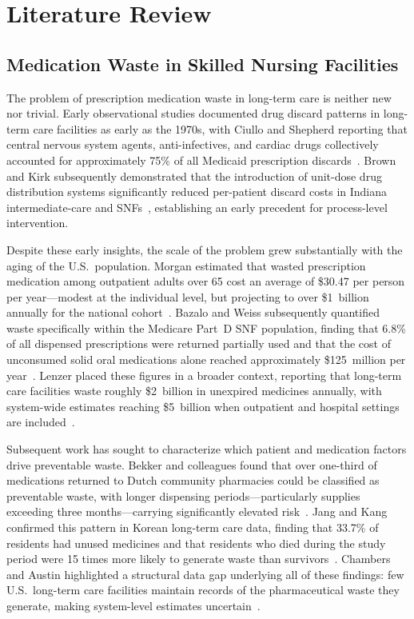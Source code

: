 \documentclass[letterpaper, 10pt, conference]{IEEEconf}
\begin{document}
\section{Literature Review}

\subsection{Medication Waste in Skilled Nursing Facilities}

The problem of prescription medication waste in long-term care is neither new
nor trivial.
Early observational studies documented drug discard patterns in long-term care
facilities as early as the 1970s, with Ciullo and Shepherd reporting that
central nervous system agents, anti-infectives, and cardiac drugs collectively
accounted for approximately 75\% of all Medicaid prescription
discards~\cite{Ciullo1977Drug}.
Brown and Kirk subsequently demonstrated that the introduction of unit-dose
drug distribution systems significantly reduced per-patient discard costs in
Indiana intermediate-care and SNFs~\cite{Brown1984Cost}, establishing an early
precedent for process-level intervention.

Despite these early insights, the scale of the problem grew substantially with
the aging of the U.S.\ population.
Morgan estimated that wasted prescription medication among outpatient adults
over 65 cost an average of \$30.47 per person per year---modest at the
individual level, but projecting to over \$1~billion annually for the national
cohort~\cite{Morgan2001The}.
Bazalo and Weiss subsequently quantified waste specifically within the Medicare
Part~D SNF population, finding that 6.8\% of all dispensed prescriptions were
returned partially used and that the cost of unconsumed solid oral medications
alone reached approximately \$125~million per year~\cite{Bazalo2011Measurement}.
Lenzer placed these figures in a broader context, reporting that long-term
care facilities waste roughly \$2~billion in unexpired medicines annually, with
system-wide estimates reaching \$5~billion when outpatient and hospital settings
are included~\cite{Lenzer2014US}.

Subsequent work has sought to characterize which patient and medication factors
drive preventable waste.
Bekker and colleagues found that over one-third of medications returned to Dutch
community pharmacies could be classified as preventable waste, with longer
dispensing periods---particularly supplies exceeding three months---carrying
significantly elevated risk~\cite{Bekker2018Patient}.
Jang and Kang confirmed this pattern in Korean long-term care data, finding
that 33.7\% of residents had unused medicines and that residents who died during
the study period were 15 times more likely to generate waste than
survivors~\cite{Jang2022Factors}.
Chambers and Austin highlighted a structural data gap underlying all of these
findings: few U.S.\ long-term care facilities maintain records of the
pharmaceutical waste they generate, making system-level estimates
uncertain~\cite{Chambers2016Assessing}.
\end{document}
